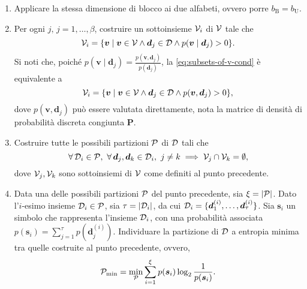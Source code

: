 \begin{enumerate}

    \item Applicare la stessa dimensione di blocco ai due alfabeti, ovvero
        porre \(b_\mathrm{B} = b_\mathrm{U}\).

    \item Per ogni \(j,\,j = 1,\dots,\beta\), costruire un sottoinsieme
        \(\mathcal{V}_i\) di \(\mathcal{V}\) tale che
        \begin{equation}
            \set{V}_i = \mleft\{
                \bm{v} \mid \bm{v} \in \set{V} \land
                \bm{d}_j \in \set{D} \land
                p(\bm{v}\given\bm{d}_j)>0
                \mright\}. \label{eq:subsets-of-v-cond}
        \end{equation}
        Si noti che, poiché \(p(\bm{v}\mid\bm{d}_j) =
        \frac{p(\bm{v},\bm{d}_j)}{p(\bm{d}_j)}\), la
        \eqref{eq:subsets-of-v-cond} è equivalente a
        \begin{equation}
            \set{V}_i = \mleft\{
                \bm{v} \mid \bm{v} \in \set{V} \land
                \bm{d}_j \in \set{D} \land
                p(\bm{v},\bm{d}_j)>0
                \mright\}, \label{eq:subsets-of-v}
        \end{equation}
        dove \(p(\bm{v},\bm{d}_j)\) può essere valutata direttamente, nota la
        matrice di densità di probabilità discreta congiunta \(\bm{P}\).

    \item Costruire tutte le possibili partizioni \(\mathcal{P}\) di \(\mathcal{D}\)
        tali che
        \begin{equation*}
            \forall \set{D}_i \in \set{P},\
            \forall \bm{d}_j,\bm{d}_k \in \set{D}_i,\
            j \neq k
            \implies \set{V}_j \cap \set{V}_k = \emptyset ,
        \end{equation*}
        dove \(\mathcal{V}_j,\mathcal{V}_k\) sono sottoinsiemi di \(\mathcal{V}\) come
        definiti al punto precedente.

    \item Data una delle possibili partizioni \(\mathcal{P}\) del punto precedente,
        sia \(\xi = \abs{\set{P}}\). Dato l'\(i\)-esimo insieme \(\mathcal{D}_i \in
        \mathcal{P}\), sia \(\tau = \abs{\set{D}_i}\), da cui \(\mathcal{D}_i =
        \{\bm{d}_1^{(i)},\dots,\bm{d}_\tau^{(i)}\}\). Sia \(\bm{s}_i\) un
        simbolo che rappresenta l'insieme \(\mathcal{D}_i\), con una probabilità
        associata \(p(\bm{s}_i) = \sum_{j=1}^\tau p(\bm{d}_j^{(i)})\).
        Individuare la partizione di \(\mathcal{D}\) a entropia minima tra quelle
        costruite al punto precedente, ovvero,
        \begin{equation}
            \mathcal{P}_\mathrm{min} = \min_{\mathcal{P}}
            \sum_{i=1}^\xi p(\bm{s}_i)\log_2\frac{1}{p(\bm{s}_i)}.
        \end{equation}

\end{enumerate}

